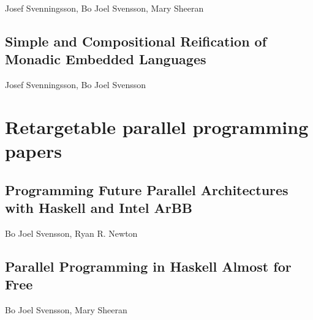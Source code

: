 \documentclass[a4paper]{book}
\begin{document}
\begin{center} 
Josef Svenningsson, Bo Joel Svensson, Mary Sheeran 
\end{center}




% 
\cleardoublepage 


\section{Simple and Compositional Reification of Monadic Embedded Languages}

\begin{center} 
Josef Svenningsson, Bo Joel Svensson
\end{center}





% 

\chapter{Retargetable parallel programming papers}
% 
\cleardoublepage 


\section{Programming Future Parallel Architectures with Haskell and Intel ArBB}

\begin{center} 
Bo Joel Svensson, Ryan R. Newton
\end{center}




% 
\cleardoublepage 


\section{Parallel Programming in Haskell Almost for Free}

\begin{center} 
Bo Joel Svensson, Mary Sheeran
\end{center}





\cleardoublepage




\end{document}
